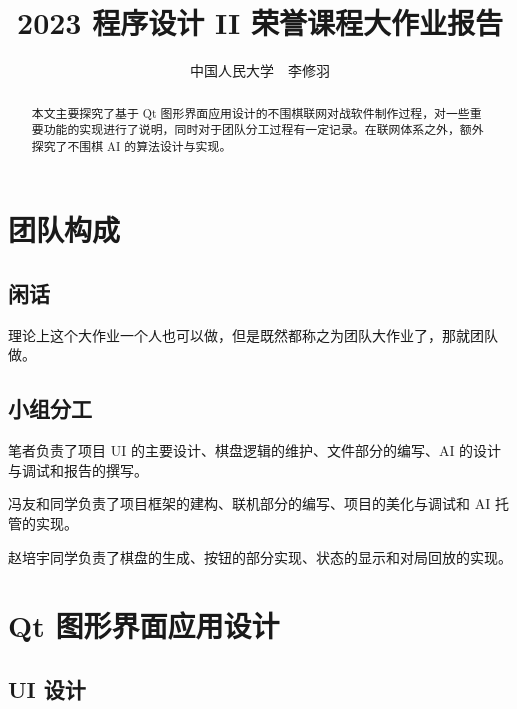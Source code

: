 \documentclass{noithesis}
\begin{document}
	
	\title{2023 程序设计 II 荣誉课程大作业报告}
	\author{中国人民大学~~李修羽}
	
	\maketitle
	
	\begin{abstract}
		本文主要探究了基于 Qt 图形界面应用设计的不围棋联网对战软件制作过程，对一些重要功能的实现进行了说明，同时对于团队分工过程有一定记录。在联网体系之外，额外探究了不围棋 AI 的算法设计与实现。
	\end{abstract}

	\tableofcontents
	\setcounter{page}{0}
	\thispagestyle{empty}
	\newpage
	
	\section{团队构成}
	
	\subsection{闲话}
	
	理论上这个大作业一个人也可以做，但是既然都称之为团队大作业了，那就团队做。
	
	\subsection{小组分工}
	
	笔者负责了项目 UI 的主要设计、棋盘逻辑的维护、文件部分的编写、AI 的设计与调试和报告的撰写。
	
	冯友和同学负责了项目框架的建构、联机部分的编写、项目的美化与调试和 AI 托管的实现。
	
	赵培宇同学负责了棋盘的生成、按钮的部分实现、状态的显示和对局回放的实现。
	
	\section{Qt 图形界面应用设计}
	
	\subsection{UI 设计}
	
\end{document}
